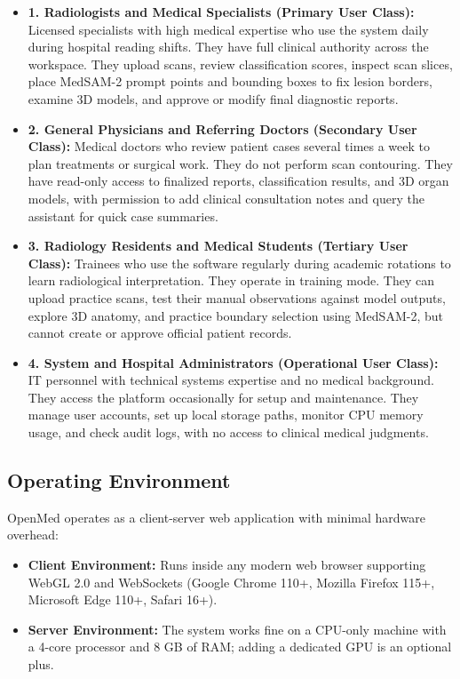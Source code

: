 \documentclass[12pt,a4paper]{report}
\begin{document}
\begin{itemize}[leftmargin=1.2em]
    \item \textbf{1. Radiologists and Medical Specialists (Primary User Class):} 
    Licensed specialists with high medical expertise who use the system daily during hospital reading shifts. They have full clinical authority across the workspace. They upload scans, review classification scores, inspect scan slices, place MedSAM-2 prompt points and bounding boxes to fix lesion borders, examine 3D models, and approve or modify final diagnostic reports.

    \item \textbf{2. General Physicians and Referring Doctors (Secondary User Class):}
    Medical doctors who review patient cases several times a week to plan treatments or surgical work. They do not perform scan contouring. They have read-only access to finalized reports, classification results, and 3D organ models, with permission to add clinical consultation notes and query the assistant for quick case summaries.

    \item \textbf{3. Radiology Residents and Medical Students (Tertiary User Class):}
    Trainees who use the software regularly during academic rotations to learn radiological interpretation. They operate in training mode. They can upload practice scans, test their manual observations against model outputs, explore 3D anatomy, and practice boundary selection using MedSAM-2, but cannot create or approve official patient records.

    \item \textbf{4. System and Hospital Administrators (Operational User Class):}
    IT personnel with technical systems expertise and no medical background. They access the platform occasionally for setup and maintenance. They manage user accounts, set up local storage paths, monitor CPU memory usage, and check audit logs, with no access to clinical medical judgments.
\end{itemize}


\subsection{Operating Environment}
OpenMed operates as a client-server web application with minimal hardware overhead:

\begin{itemize}[leftmargin=1.2em]
    \item \textbf{Client Environment:} Runs inside any modern web browser supporting WebGL 2.0 and WebSockets (Google Chrome 110+, Mozilla Firefox 115+, Microsoft Edge 110+, Safari 16+).
    \item \textbf{Server Environment:} The system works fine on a CPU-only machine with a 4-core processor and 8 GB of RAM; adding a dedicated GPU is an optional plus.
\end{itemize}
\end{document}
